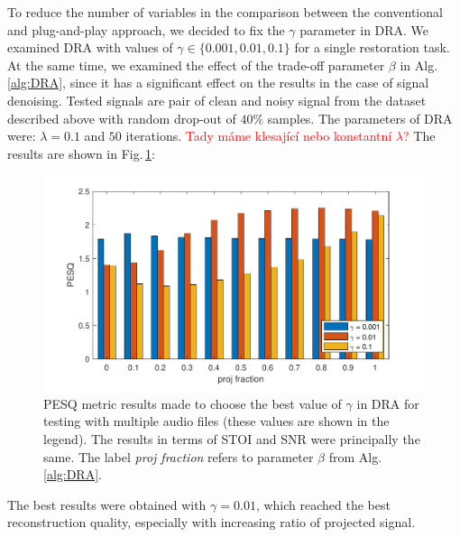 \documentclass[conference]{IEEEtran}
\newcommand{\todo}[1]{\textcolor{red}{#1}}
\begin{document}
To reduce the number of variables in the comparison between the conventional and plug-and-play approach, we decided to fix the $\gamma$ parameter in DRA.
We examined DRA with values of $\gamma\in\{0.001, 0.01,0.1\}$ for a single restoration task.
At the same time, we examined the effect of the trade-off parameter $\beta$ in Alg.\,\ref{alg:DRA}, since it has a significant effect on the results in the case of signal denoising. 
Tested signals are pair of clean and noisy signal from the dataset described above with random drop-out of $40\%$ samples.
The parameters of DRA were: $\lambda=0.1$ and $50$ iterations. \todo{Tady máme klesající nebo konstantní $\lambda$?}
The results are shown in Fig.\,\ref{fig:gammatest}:

\begin{figure}[h]
	\includegraphics[width=1\linewidth]{figures/gamma_test}
	\caption{PESQ metric results made to choose the best value of $\gamma$ in DRA for testing with multiple audio files (these values are shown in the legend). %
	The results in terms of STOI and SNR were principally the same.
	The label \textit{proj fraction} refers to parameter $\beta$ from Alg.\,\ref{alg:DRA}.}
	\label{fig:gammatest}
\end{figure}

The best results were obtained with $\gamma=0.01$, which reached the best reconstruction quality, especially with increasing ratio of projected signal.
\end{document}
